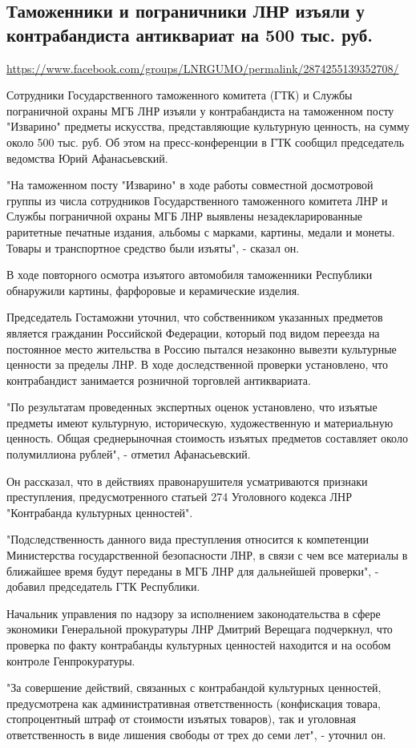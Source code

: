  
 
\subsection{Таможенники и пограничники ЛНР изъяли у контрабандиста антиквариат на 500 тыс. руб.}
\label{sec:24_07_2020.fb.lnr.1}
\url{https://www.facebook.com/groups/LNRGUMO/permalink/2874255139352708/}

Сотрудники Государственного таможенного комитета (ГТК) и Службы пограничной
охраны МГБ ЛНР изъяли у контрабандиста на таможенном посту "Изварино" предметы
искусства, представляющие культурную ценность, на сумму около 500 тыс. руб. Об
этом на пресс-конференции в ГТК сообщил председатель ведомства Юрий
Афанасьевский.

"На таможенном посту "Изварино" в ходе работы совместной досмотровой группы из
числа сотрудников Государственного таможенного комитета ЛНР и Службы
пограничной охраны МГБ ЛНР выявлены незадекларированные раритетные печатные
издания, альбомы с марками, картины, медали и монеты. Товары и транспортное
средство были изъяты", - сказал он.

В ходе повторного осмотра изъятого автомобиля таможенники Республики обнаружили
картины, фарфоровые и керамические изделия.

Председатель Гостаможни уточнил, что собственником указанных предметов является
гражданин Российской Федерации, который под видом переезда на постоянное место
жительства в Россию пытался незаконно вывезти культурные ценности за пределы
ЛНР. В ходе доследственной проверки установлено, что контрабандист занимается
розничной торговлей антиквариата.

"По результатам проведенных экспертных оценок установлено, что изъятые предметы
имеют культурную, историческую, художественную и материальную ценность. Общая
среднерыночная стоимость изъятых предметов составляет около полумиллиона
рублей", - отметил Афанасьевский.

Он рассказал, что в действиях правонарушителя усматриваются признаки
преступления, предусмотренного статьей 274 Уголовного кодекса ЛНР "Контрабанда
культурных ценностей".

"Подследственность данного вида преступления относится к компетенции
Министерства государственной безопасности ЛНР, в связи с чем все материалы в
ближайшее время будут переданы в МГБ ЛНР для дальнейшей проверки", - добавил
председатель ГТК Республики.

Начальник управления по надзору за исполнением законодательства в сфере
экономики Генеральной прокуратуры ЛНР Дмитрий Верещага подчеркнул, что проверка
по факту контрабанды культурных ценностей находится и на особом контроле
Генпрокуратуры.

"За совершение действий, связанных с контрабандой культурных ценностей,
предусмотрена как административная ответственность (конфискация товара,
стопроцентный штраф от стоимости изъятых товаров), так и уголовная
ответственность в виде лишения свободы от трех до семи лет", - уточнил он.

  
